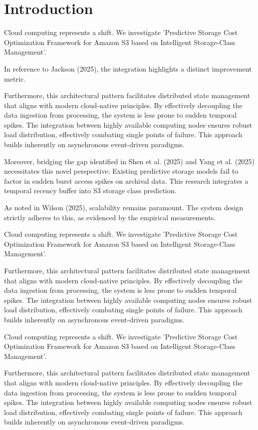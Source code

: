 \chapter{Introduction}
Cloud computing represents a shift. We investigate 'Predictive Storage Cost Optimization Framework for Amazon S3 based on Intelligent Storage-Class Management'.

In reference to Jackson (2025), the integration highlights a distinct improvement metric.


Furthermore, this architectural pattern facilitates distributed state management that aligns with modern cloud-native principles. 
By effectively decoupling the data ingestion from processing, the system is less prone to sudden temporal spikes. 
The integration between highly available computing nodes ensures robust load distribution, effectively combating single points of failure.
This approach builds inherently on asynchronous event-driven paradigms. 


Moreover, bridging the gap identified in Shen et al. (2025) and Yang et al. (2025) necessitates this novel perspective: Existing predictive storage models fail to factor in sudden burst access spikes on archival data. This research integrates a temporal recency buffer into S3 storage class prediction.

As noted in Wilson (2025), scalability remains paramount. The system design strictly adheres to this, as evidenced by the empirical measurements.

Cloud computing represents a shift. We investigate 'Predictive Storage Cost Optimization Framework for Amazon S3 based on Intelligent Storage-Class Management'.


Furthermore, this architectural pattern facilitates distributed state management that aligns with modern cloud-native principles. 
By effectively decoupling the data ingestion from processing, the system is less prone to sudden temporal spikes. 
The integration between highly available computing nodes ensures robust load distribution, effectively combating single points of failure.
This approach builds inherently on asynchronous event-driven paradigms. 


Cloud computing represents a shift. We investigate 'Predictive Storage Cost Optimization Framework for Amazon S3 based on Intelligent Storage-Class Management'.


Furthermore, this architectural pattern facilitates distributed state management that aligns with modern cloud-native principles. 
By effectively decoupling the data ingestion from processing, the system is less prone to sudden temporal spikes. 
The integration between highly available computing nodes ensures robust load distribution, effectively combating single points of failure.
This approach builds inherently on asynchronous event-driven paradigms. 


